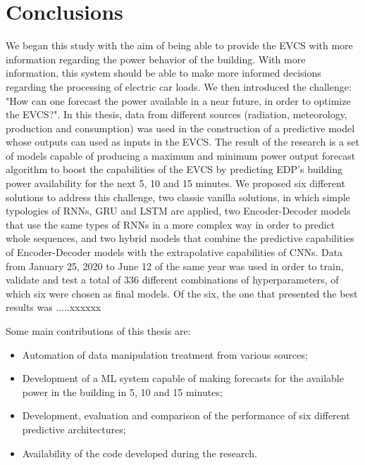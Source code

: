 \cleardoublepage
\label{chap:conclusion}

\section{Conclusions}

We began this study with the aim of being able to provide the \ac{EVCS} with more information regarding the power behavior of the building. With more information, this system should be able to make more informed decisions regarding the processing of electric car loads. We then introduced the challenge: "How can one forecast the power available in a near future, in order to optimize the \ac{EVCS}?". In this thesis, data from different sources (radiation, meteorology, production and consumption) was used in the construction of a predictive model whose outputs can used as inputs in the \ac{EVCS}. The result of the research is a set of models capable of producing a maximum and minimum power output forecast algorithm to boost the capabilities of the \ac{EVCS} by predicting \ac{EDP}'s building power availability for the next 5, 10 and 15 minutes. We proposed six different solutions to address this challenge, two classic vanilla solutions, in which simple typologies of \ac{RNN}s, \ac{GRU} and \ac{LSTM} are applied, two Encoder-Decoder models that use the same types of \ac{RNN}s in a more complex way in order to predict whole sequences, and two hybrid models that combine the predictive capabilities of Encoder-Decoder models with the extrapolative capabilities of \ac{CNN}s. Data from January 25, 2020 to June 12 of the same year was used in order to train, validate and test a total of 336 different combinations of hyperparameters, of which six were chosen as final models. Of the six, the one that presented the best results was .....xxxxxx

Some main contributions of this thesis are:
\begin{itemize}
\setlength\itemsep{0.1em}
    \item Automation of data manipulation treatment from various sources;
    \item Development of a \ac{ML} system capable of making forecasts for the available power in the building in 5, 10 and 15 minutes;
    \item Development, evaluation and comparison of the performance of six different predictive architectures;
    \item Availability of the code developed during the research.
\end{itemize}



